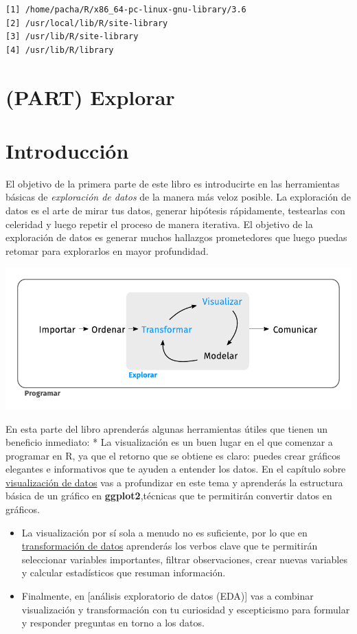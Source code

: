 \documentclass[11pt,oneside]{report}
\begin{document}
\begin{verbatim}
[1] /home/pacha/R/x86_64-pc-linux-gnu-library/3.6
[2] /usr/local/lib/R/site-library
[3] /usr/lib/R/site-library
[4] /usr/lib/R/library
\end{verbatim}

\hypertarget{part-explorar}{%
\chapter*{(PART) Explorar}\label{part-explorar}}

\hypertarget{explorar-introduccion}{%
\chapter{Introducción}\label{explorar-introduccion}}

El objetivo de la primera parte de este libro es introducirte en las
herramientas básicas de \emph{exploración de datos} de la manera más
veloz posible. La exploración de datos es el arte de mirar tus datos,
generar hipótesis rápidamente, testearlas con celeridad y luego repetir
el proceso de manera iterativa. El objetivo de la exploración de datos
es generar muchos hallazgos prometedores que luego puedas retomar para
explorarlos en mayor profundidad.

\begin{center}\includegraphics[width=0.75\linewidth]{diagrams_pdf/es/data-science-explore} \end{center}

En esta parte del libro aprenderás algunas herramientas útiles que
tienen un beneficio inmediato: * La visualización es un buen lugar en el
que comenzar a programar en R, ya que el retorno que se obtiene es
claro: puedes crear gráficos elegantes e informativos que te ayuden a
entender los datos. En el capítulo sobre
\protect\hyperlink{visualizaciuxf3n-de-datos}{visualización de datos}
vas a profundizar en este tema y aprenderás la estructura básica de un
gráfico en \textbf{ggplot2},técnicas que te permitirán convertir datos
en gráficos.

\begin{itemize}
\item
  La visualización por sí sola a menudo no es suficiente, por lo que en
  \protect\hyperlink{transform}{transformación de datos} aprenderás los
  verbos clave que te permitirán seleccionar variables importantes,
  filtrar observaciones, crear nuevas variables y calcular estadísticos
  que resuman información.
\item
  Finalmente, en {[}análisis exploratorio de datos (EDA){]} vas a
  combinar visualización y transformación con tu curiosidad y
  escepticismo para formular y responder preguntas en torno a los datos.
\end{itemize}
\end{document}
